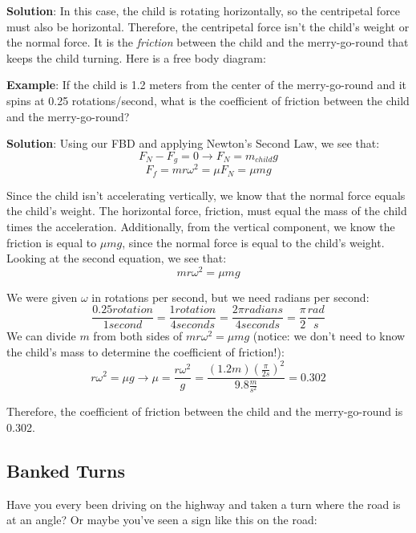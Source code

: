 \textbf{Solution}: In this case, the child is rotating horizontally, so the centripetal force must also be horizontal. Therefore, the centripetal force isn't the child's weight or the normal force. It is the \textit{friction} between the child and the merry-go-round that keeps the child turning. Here is a free body diagram:


\textbf{Example}: If the child is 1.2 meters from the center of the merry-go-round and it spins at 0.25 rotations/second, what is the coefficient of friction between the child and the merry-go-round?

\textbf{Solution}: Using our FBD and applying Newton's Second Law, we see that:
$$F_N - F_g = 0 \to F_N = m_{child}g$$
$$F_f = m r \omega^2 = \mu F_N = \mu m g$$

Since the child isn't accelerating vertically, we know that the normal force equals the child's weight. The horizontal force, friction, must equal the mass of the child times the acceleration. Additionally, from the vertical component, we know the friction is equal to $\mu m g$, since the normal force is equal to the child's weight. Looking at the second equation, we see that:
$$m r \omega^2 = \mu m g$$

We were given $\omega$ in rotations per second, but we need radians per second:
$$\frac{0.25 rotation}{1 second} = \frac{1 rotation}{4 seconds} = \frac{2\pi radians}{4 seconds} = \frac{\pi}{2} \frac{rad}{s}$$
We can divide $m$ from both sides of $mr\omega^2 = \mu m g$ (notice: we don't need to know the child's mass to determine the coefficient of friction!):
$$r \omega^2 = \mu g \to \mu = \frac{r \omega^2}{g} = \frac{\left( 1.2 m \right) \left( \frac{\pi}{2 s} \right)^2}{9.8 \frac{m}{s^2}} = 0.302$$

Therefore, the coefficient of friction between the child and the merry-go-round is 0.302. 

\subsection{Banked Turns}
Have you every been driving on the highway and taken a turn where the road is at an angle? Or maybe you've seen a sign like this on the road:

